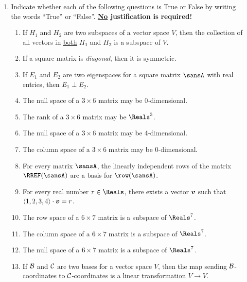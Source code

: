 \documentclass[12pt]{article}
\begin{document}
\begin{enumerate}[topsep=0.125in, itemsep=0.5in]
		\item Indicate whether each of the following questions is True or False by writing the words ``True'' or ``False''. \textbf{\ul{No} justification is required!}
		\begin{enumerate}[topsep=0.125in, itemsep=0.25in] %
			\item If $H_1$ and $H_2$ are two subspaces of a vector space $V$, then the collection of all vectors in \ul{both} $H_1$ and $H_2$ is a subspace of $V$.
			
			\item If a square matrix is \textit{diagonal}, then it is symmetric. 
			
			\item If $E_1$ and $E_2$ are two eigenspaces for a square matrix $\sansA$ with real entries, then $E_1\perp E_2$.
			\item The null space of a $3\times 6$ matrix may be 0-dimensional.
			
			\item The rank of a $3\times 6$ matrix may be $\Reals^3$.
			
			\item The null space of a $3\times 6$ matrix may be 4-dimensional.
			
			\item The column space of a $3\times 6$ matrix may be 0-dimensional.
			
			\item For every matrix $\sansA$, the linearly independent rows of the matrix $\RREF(\sansA)$ are a basis for $\row(\sansA)$.
			
			\item For every real number $r\in\Reals$, there exists a vector $\boldsymbol{v}$ such that $\langle1,2,3,4\rangle\cdot\boldsymbol{v}=r$.
			
			\item The row space of a $6\times 7$ matrix is a subspace of $\Reals^7$.
			
			\item The column space of a $6\times 7$ matrix is a subspace of $\Reals^7$.
			
			\item The null space of a $6\times 7$ matrix is a subspace of $\Reals^7$.
						
			\item If $\mathcal{B}$ and $\mathcal{C}$ are two bases for a vector space $V$, then the map sending $\mathcal{B}$-coordinates to $\mathcal{C}$-coordinates is a linear transformation $V\to V$.
			

\end{enumerate}
\end{enumerate}
\end{document}
